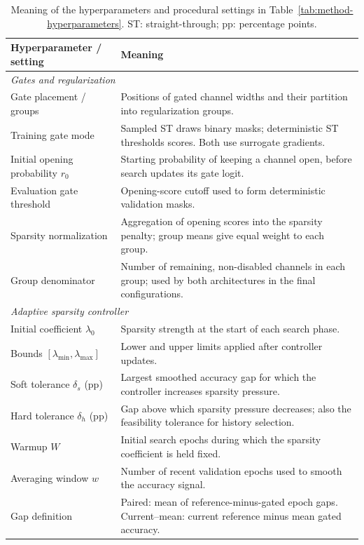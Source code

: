 \begin{table}[!t]
\caption{Meaning of the hyperparameters and procedural settings in
Table~\ref{tab:method-hyperparameters}. ST: straight-through; pp: percentage points.}
\label{tab:method-hyperparameter-descriptions}
\centering\footnotesize
\setlength{\tabcolsep}{5pt}
\begin{tabular}{@{}p{}p{}@{}}
\toprule
Hyperparameter / setting & Meaning \\
\midrule
\multicolumn{2}{l}{\textit{Gates and regularization}} \\
Gate placement / groups & Positions of gated channel widths and their partition into regularization groups. \\
Training gate mode & Sampled ST draws binary masks; deterministic ST thresholds scores. Both use surrogate gradients. \\
Initial opening probability $r_0$ & Starting probability of keeping a channel open, before search updates its gate logit. \\
Evaluation gate threshold & Opening-score cutoff used to form deterministic validation masks. \\
Sparsity normalization & Aggregation of opening scores into the sparsity penalty; group means give equal weight to each group. \\
Group denominator & Number of remaining, non-disabled channels in each group; used by both architectures in the final configurations. \\
\midrule
\multicolumn{2}{l}{\textit{Adaptive sparsity controller}} \\
Initial coefficient $\lambda_0$ & Sparsity strength at the start of each search phase. \\
Bounds $[\lambda_{\min},\lambda_{\max}]$ & Lower and upper limits applied after controller updates. \\
Soft tolerance $\delta_s$ (pp) & Largest smoothed accuracy gap for which the controller increases sparsity pressure. \\
Hard tolerance $\delta_h$ (pp) & Gap above which sparsity pressure decreases; also the feasibility tolerance for history selection. \\
Warmup $W$ & Initial search epochs during which the sparsity coefficient is held fixed. \\
Averaging window $w$ & Number of recent validation epochs used to smooth the accuracy signal. \\
Gap definition & Paired: mean of reference-minus-gated epoch gaps. Current--mean: current reference minus mean gated accuracy. \\

\end{tabular}
\end{table}
